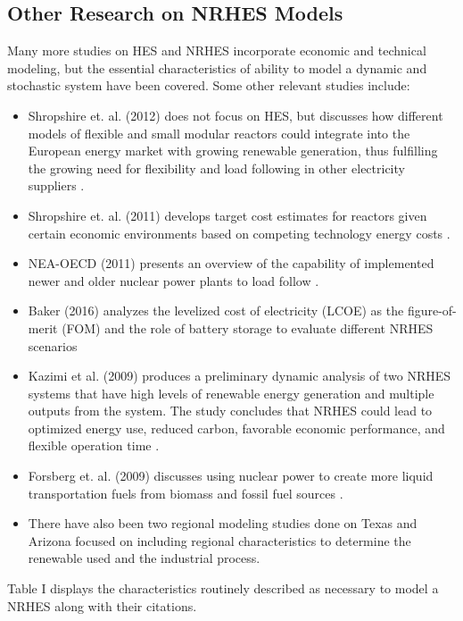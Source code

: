 \documentclass[12pt]{UIdahoMastersThesis}
\begin{document}
\subsection{Other Research on NRHES Models}
Many more studies on HES and NRHES incorporate economic and technical modeling, but the essential characteristics of ability to model a dynamic and stochastic system have been covered. Some other relevant studies include: 
\begin{itemize}
\item Shropshire et. al. (2012) does not focus on HES, but discusses how different models of flexible and small modular reactors could integrate into the European energy market with growing renewable generation, thus fulfilling the growing need for flexibility and load following in other electricity suppliers \cite{Shropshire2012}. 
\item Shropshire et. al. (2011) develops target cost estimates for reactors given certain economic environments based on competing technology energy costs \cite{Shropshire2011}. 
\item NEA-OECD (2011) presents an overview of the capability of implemented newer and older nuclear power plants to load follow \cite{Nuclear2011}. 
\item Baker (2016) analyzes the levelized cost of electricity (LCOE) as the figure-of-merit (FOM) and the role of battery storage to evaluate different NRHES scenarios \cite{Baker2016}
\item Kazimi et al. (2009) produces a preliminary dynamic analysis of two NRHES systems that have high levels of renewable energy generation and multiple outputs from the system. The study concludes that NRHES could lead to optimized energy use, reduced carbon, favorable economic performance, and flexible operation time \cite{Kazimi}. 
\item Forsberg et. al. (2009) discusses using nuclear power to create more liquid transportation fuels from biomass and fossil fuel sources \cite{Forsberg2009}. 
\item There have also been two regional modeling studies done on Texas and Arizona focused on including regional characteristics to determine the renewable used and the industrial process.  
\end{itemize}
Table I displays the characteristics routinely described as necessary to model a NRHES along with their citations.
\end{document}
